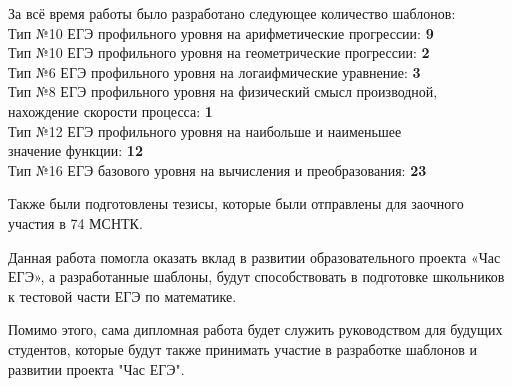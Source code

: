 За всё время работы было разработано следующее количество шаблонов:
\\Тип №10 ЕГЭ профильного уровня на арифметические прогрессии: \textbf{9}
\\Тип №10 ЕГЭ профильного уровня на геометрические прогрессии: \textbf{2}
\\Тип №6 ЕГЭ профильного уровня на логаифмические уравнение: \textbf{3}
\\Тип №8 ЕГЭ профильного уровня на физический смысл производной,
\\ нахождение скорости процесса: \textbf{1}
\\Тип №12 ЕГЭ профильного уровня на наибольше и наименьшее 
\\значение функции: \textbf{12}
\\Тип №16 ЕГЭ базового уровня на вычисления и преобразования: \textbf{23}

Также были подготовлены тезисы, которые были отправлены для заочного участия в 74 МСНТК.

Данная работа помогла оказать вклад в развитии образовательного проекта «Час ЕГЭ», а разработанные шаблоны, будут способствовать в подготовке школьников к тестовой части ЕГЭ по математике. 

Помимо этого, сама дипломная работа будет служить руководством для будущих студентов, которые будут также принимать участие в разработке шаблонов и развитии проекта "Час ЕГЭ".




